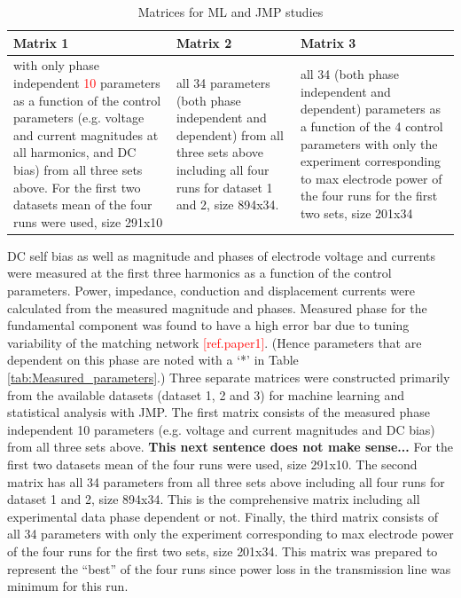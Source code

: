 \documentclass[12pt]{iopart}
\begin{document}
\begin{table}[]
    \centering
\begin{tabular}{ |p{4cm}|p{4cm}|p{4cm}| }
        \hline
        Matrix 1 & Matrix 2 & Matrix 3 \\
        \hline
         with only phase independent \textcolor{red}{10} parameters as a function of the control parameters (e.g. voltage and current magnitudes at all harmonics, and DC bias) from all three sets above. For the first two datasets mean of the four runs were used, size 291x10 & all 34 parameters (both phase independent and dependent) from all three sets above including all four runs for dataset 1 and 2, size 894x34. & 
         all 34 (both phase independent and dependent) parameters as a function of the 4 control parameters with only the experiment corresponding to max electrode power of the four runs for the first two sets, size 201x34\\
        \hline
    \end{tabular}
    \caption{Matrices for ML and JMP studies }
    \label{tab:ML_matrices}
\end{table}

DC self bias as well as magnitude and phases of electrode voltage and currents were measured at the first three harmonics as a function of the control parameters. Power, impedance, conduction and displacement currents were calculated from the measured magnitude and phases. Measured phase for the fundamental component was found to have a high error bar due to tuning variability of the matching network \textcolor{red}{[ref.paper1]}. (Hence parameters that are dependent on this phase are noted with a `*' in Table \ref{tab:Measured_parameters}.) Three separate matrices were constructed primarily from the available datasets (dataset 1, 2 and 3) for machine learning and statistical analysis with JMP. The first matrix consists of the measured phase independent 10 parameters (e.g. voltage and current magnitudes and DC bias) from all three sets above. \textbf{This next sentence does not make sense...} For the first two datasets mean of the four runs were used, size 291x10. The second matrix has all 34 parameters from all three sets above including all four runs for dataset 1 and 2, size 894x34. This is the comprehensive matrix including all experimental data phase dependent or not. Finally, the third matrix consists of all 34 parameters with only the experiment corresponding to max electrode power of the four runs for the first two sets, size 201x34. This matrix was prepared to represent the ``best'' of the four runs since power loss in the transmission line was minimum for this run.  
\end{document}
